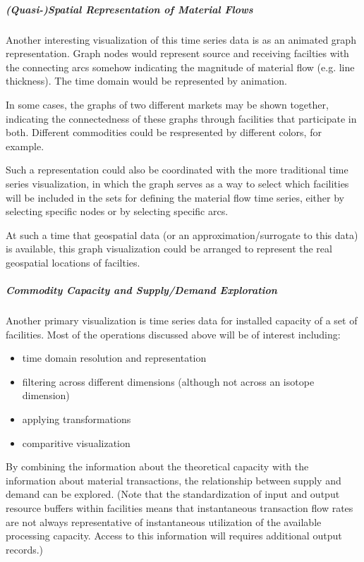 \documentclass[letterpaper,10pt,english]{sphinxmanual}
\begin{document}
\subparagraph{(Quasi-)Spatial Representation of Material Flows}
\label{devdoc/output_usecases:quasi-spatial-representation-of-material-flows}
Another interesting visualization of this time series data is as an
animated graph representation.  Graph nodes would represent source and
receiving facilties with the connecting arcs somehow indicating the
magnitude of material flow (e.g. line thickness).  The time domain
would be represented by animation.

In some cases, the graphs of two different markets may be shown
together, indicating the connectedness of these graphs through
facilities that participate in both.  Different commodities could be
respresented by different colors, for example.

Such a representation could also be coordinated with the more
traditional time series visualization, in which the graph serves as a
way to select which facilities will be included in the sets for
defining the material flow time series, either by selecting specific
nodes or by selecting specific arcs.

At such a time that geospatial data (or an approximation/surrogate to
this data) is available, this graph visualization could be arranged to
represent the real geospatial locations of facilties.


\subparagraph{Commodity Capacity and Supply/Demand Exploration}
\label{devdoc/output_usecases:commodity-capacity-and-supply-demand-exploration}
Another primary visualization is time series data for installed
capacity of a set of facilities.  Most of the operations discussed
above will be of interest including:
\begin{itemize}
\item {} 
time domain resolution and representation

\item {} 
filtering across different dimensions (although not across an isotope dimension)

\item {} 
applying transformations

\item {} 
comparitive visualization

\end{itemize}

By combining the information about the theoretical capacity with the
information about material transactions, the relationship between
supply and demand can be explored.  (Note that the standardization of
input and output resource buffers within facilities means that
instantaneous transaction flow rates are not always representative of
instantaneous utilization of the available processing capacity.
Access to this information will requires additional output records.)
\end{document}
